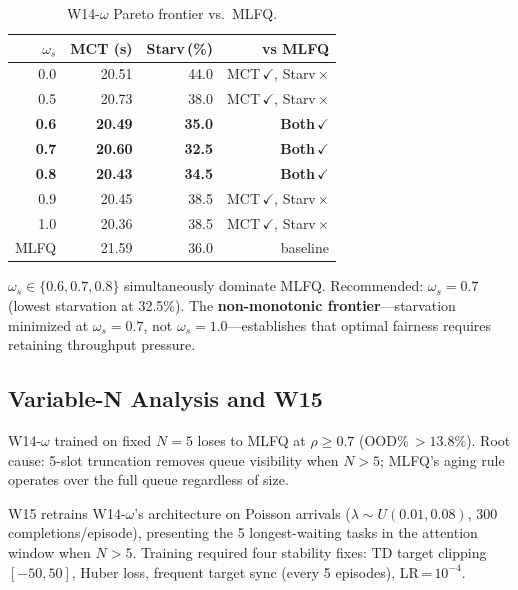 \documentclass[10pt,twocolumn]{article}
\theoremstyle{remark}
\begin{document}
\begin{table}[h]
\centering
\caption{W14-$\omega$ Pareto frontier vs.\ MLFQ.}
\label{tab:omega}
\small
\begin{tabular}{rrrr}
\toprule
$\omega_s$ & MCT (s) & Starv\,(\%) & vs MLFQ \\
\midrule
0.0 & 20.51 & 44.0 & MCT\,$\checkmark$, Starv\,$\times$ \\
0.5 & 20.73 & 38.0 & MCT\,$\checkmark$, Starv\,$\times$ \\
\textbf{0.6} & \textbf{20.49} & \textbf{35.0} & \textbf{Both}\,$\checkmark$ \\
\textbf{0.7} & \textbf{20.60} & \textbf{32.5} & \textbf{Both}\,$\checkmark$ \\
\textbf{0.8} & \textbf{20.43} & \textbf{34.5} & \textbf{Both}\,$\checkmark$ \\
0.9 & 20.45 & 38.5 & MCT\,$\checkmark$, Starv\,$\times$ \\
1.0 & 20.36 & 38.5 & MCT\,$\checkmark$, Starv\,$\times$ \\
\midrule
MLFQ & 21.59 & 36.0 & baseline \\
\bottomrule
\end{tabular}
\end{table}

$\omega_s\in\{0.6,0.7,0.8\}$ simultaneously dominate MLFQ.
Recommended: $\omega_s=0.7$ (lowest starvation at 32.5\%).
The \textbf{non-monotonic frontier}---starvation minimized at
$\omega_s=0.7$, not $\omega_s=1.0$---establishes that optimal
fairness requires retaining throughput pressure.

\subsection{Variable-N Analysis and W15}

W14-$\omega$ trained on fixed $N=5$ loses to MLFQ at $\rho\geq0.7$
(OOD\%\,$>13.8\%$). Root cause: 5-slot truncation removes queue
visibility when $N>5$; MLFQ's aging rule operates over the full
queue regardless of size.

W15 retrains W14-$\omega$'s architecture on Poisson arrivals
($\lambda\sim U(0.01,0.08)$, 300 completions/episode), presenting
the 5 longest-waiting tasks in the attention window when $N>5$.
Training required four stability fixes: TD target clipping $[-50,50]$,
Huber loss, frequent target sync (every 5 episodes), LR\,=\,$10^{-4}$.
\end{document}

